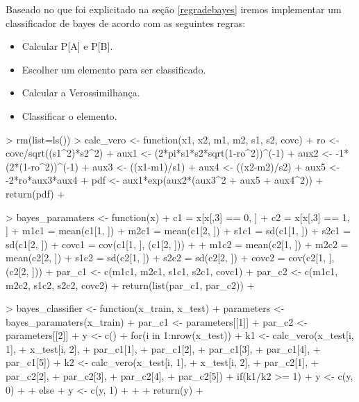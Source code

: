 \documentclass[12pt]{article}
\begin{document}
  \par Baseado no que foi explicitado na seção \ref{regradebayes} iremos implementar um classificador de bayes de acordo com as seguintes regras:
  
  \begin{itemize}
  \item Calcular P[A] e P[B].
  \item Escolher um elemento para ser classificado. 
  \item Calcular a Verossimilhança. 
  \item Classificar o elemento.
  \end{itemize}

\begin{Schunk}
\begin{Sinput}
> rm(list=ls())
> calc_vero <- function(x1, x2, m1, m2, s1, s2, covc){
+   ro <- covc/sqrt((s1^2)*s2^2)
+   aux1 <- (2*pi*s1*s2*sqrt(1-ro^2))^(-1)
+   aux2 <- -1*(2*(1-ro^2))^(-1)
+   aux3 <- ((x1-m1)/s1)
+   aux4 <- ((x2-m2)/s2)
+   aux5 <- -2*ro*aux3*aux4
+   pdf <- aux1*exp(aux2*(aux3^2 + aux5 + aux4^2))
+   return(pdf)
+ }
\end{Sinput}
\end{Schunk}

  \par 
\begin{Schunk}
\begin{Sinput}
> bayes_paramaters <- function(x){
+   c1 = x[x[,3] == 0, ]
+   c2 = x[x[,3] == 1, ]
+   m1c1 = mean(c1[1, ])
+   m2c1 = mean(c1[2, ])
+   s1c1 = sd(c1[1, ])
+   s2c1 = sd(c1[2, ])
+   covc1 = cov(c1[1, ], (c1[2, ]))
+   
+   m1c2 = mean(c2[1, ])
+   m2c2 = mean(c2[2, ])
+   s1c2 = sd(c2[1, ])
+   s2c2 = sd(c2[2, ])
+   covc2 = cov(c2[1, ], (c2[2, ]))
+   par_c1 <- c(m1c1, m2c1, s1c1, s2c1, covc1)
+   par_c2 <- c(m1c1, m2c2, s1c2, s2c2, covc2)
+   return(list(par_c1, par_c2))
+ }
\end{Sinput}
\end{Schunk}

  \par 
\begin{Schunk}
\begin{Sinput}
> bayes_classifier <- function(x_train, x_test){
+   parameters <- bayes_paramaters(x_train)
+   par_c1 <- parameters[[1]]
+   par_c2 <- parameters[[2]]
+   y <- c()
+   for(i in 1:nrow(x_test)){
+     k1 <- calc_vero(x_test[i, 1],
+                     x_test[i, 2],
+                     par_c1[1],
+                     par_c1[2],
+                     par_c1[3],
+                     par_c1[4],
+                     par_c1[5])
+     k2 <- calc_vero(x_test[i, 1],
+                     x_test[i, 2],
+                     par_c2[1],
+                     par_c2[2],
+                     par_c2[3],
+                     par_c2[4],
+                     par_c2[5])
+     if(k1/k2 >= 1){
+       y <- c(y, 0)
+     }
+     else{
+       y <- c(y, 1)
+     }
+   }
+   return(y)
+ }
\end{Sinput}
\end{Schunk}
\end{document}

